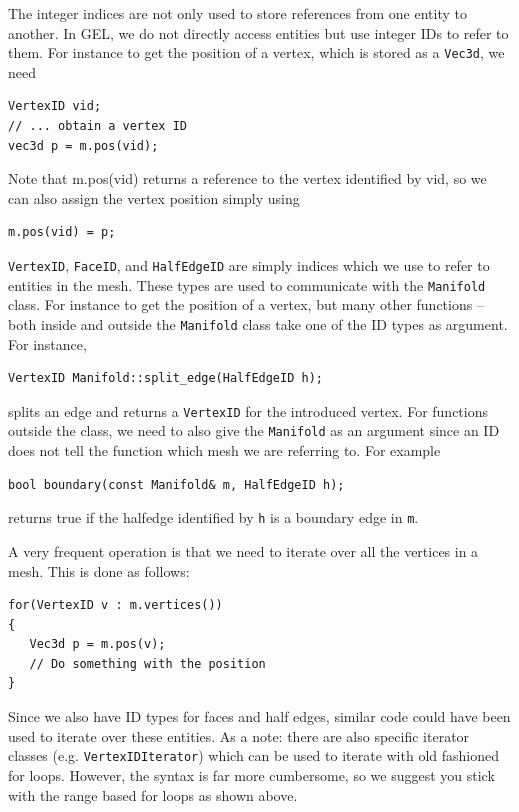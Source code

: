 \documentclass[a4paper]{article}
\begin{document}
The integer indices are not only used to store references from one entity to another. In GEL, we do not directly access entities but use integer IDs to refer to them. For instance to get the position of a vertex, which is stored as a \texttt{Vec3d}, we need
\begin{verbatim}
VertexID vid;
// ... obtain a vertex ID
vec3d p = m.pos(vid);
\end{verbatim}
Note that m.pos(vid) returns a reference to the vertex identified by vid, so we can also assign the vertex position simply using 
\begin{verbatim}
m.pos(vid) = p;
\end{verbatim}
\texttt{VertexID}, \texttt{FaceID}, and \texttt{HalfEdgeID} are simply indices which we use to refer to entities in the mesh. These types are used to communicate with the \texttt{Manifold} class. For instance to get the position of a vertex, but many other functions -- both inside and outside the \texttt{Manifold} class take one of the ID types as argument. For instance,
\begin{verbatim}
VertexID Manifold::split_edge(HalfEdgeID h);
\end{verbatim}
splits an edge and returns a \texttt{VertexID} for the introduced vertex. For functions outside the class, we need to also give the \texttt{Manifold} as an argument since an ID does not tell the function which mesh we are referring to. For example
\begin{verbatim}
bool boundary(const Manifold& m, HalfEdgeID h);
\end{verbatim}
returns true if the halfedge identified by \texttt{h} is a boundary edge in \texttt{m}.

A very frequent operation is that we need to iterate over all the vertices in a mesh. This is done as follows:
\begin{verbatim}
for(VertexID v : m.vertices())
{
   Vec3d p = m.pos(v);
   // Do something with the position
}
\end{verbatim}
Since we also have ID types for faces and half edges, similar code could have been used to iterate over these entities. As a note: there are also specific iterator classes (e.g. \texttt{VertexIDIterator}) which can be used to iterate with old fashioned for loops. However, the syntax is far more cumbersome, so we suggest you stick with the range based for loops as  shown above.
\end{document}
